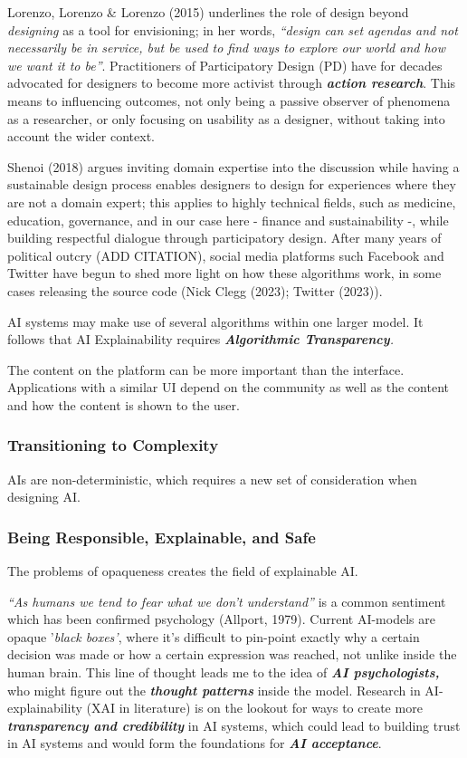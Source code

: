 \documentclass[
  letterpaper,
  DIV=11,
  numbers=noendperiod]{scrartcl}
\begin{document}
Lorenzo, Lorenzo \& Lorenzo (2015) underlines the role of design beyond
\emph{designing} as a tool for envisioning; in her words, \emph{``design
can set agendas and not necessarily be in service, but be used to find
ways to explore our world and how we want it to be''}. Practitioners of
Participatory Design (PD) have for decades advocated for designers to
become more activist through \textbf{\emph{action research}}. This means
to influencing outcomes, not only being a passive observer of phenomena
as a researcher, or only focusing on usability as a designer, without
taking into account the wider context.

Shenoi (2018) argues inviting domain expertise into the discussion while
having a sustainable design process enables designers to design for
experiences where they are not a domain expert; this applies to highly
technical fields, such as medicine, education, governance, and in our
case here - finance and sustainability -, while building respectful
dialogue through participatory design. After many years of political
outcry (ADD CITATION), social media platforms such Facebook and Twitter
have begun to shed more light on how these algorithms work, in some
cases releasing the source code (Nick Clegg (2023); Twitter (2023)).

AI systems may make use of several algorithms within one larger model.
It follows that AI Explainability requires \emph{\textbf{Algorithmic
Transparency}.}

The content on the platform can be more important than the interface.
Applications with a similar UI depend on the community as well as the
content and how the content is shown to the user.

\subsubsection{Transitioning to
Complexity}\label{transitioning-to-complexity}

AIs are non-deterministic, which requires a new set of consideration
when designing AI.

\subsubsection{Being Responsible, Explainable, and
Safe}\label{being-responsible-explainable-and-safe}

The problems of opaqueness creates the field of explainable AI.

\emph{``As humans we tend to fear what we don't understand''} is a
common sentiment which has been confirmed psychology (Allport, 1979).
Current AI-models are opaque '\emph{black boxes'}, where it's difficult
to pin-point exactly why a certain decision was made or how a certain
expression was reached, not unlike inside the human brain. This line of
thought leads me to the idea of \textbf{\emph{AI psychologists,}} who
might figure out the \textbf{\emph{thought patterns}} inside the model.
Research in AI-explainability (XAI in literature) is on the lookout for
ways to create more \textbf{\emph{transparency and credibility}} in AI
systems, which could lead to building trust in AI systems and would form
the foundations for \textbf{\emph{AI acceptance}}.
\end{document}
